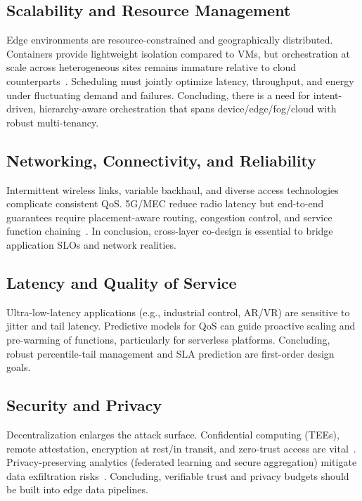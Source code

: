 \documentclass[conference]{IEEEtran}
\begin{document}
\subsection{Scalability and Resource Management}
Edge environments are resource-constrained and geographically distributed. Containers provide lightweight isolation compared to VMs, but orchestration at scale across heterogeneous sites remains immature relative to cloud counterparts~\cite{Mao2017MEC,Mach2017MEC}. Scheduling must jointly optimize latency, throughput, and energy under fluctuating demand and failures. Concluding, there is a need for intent-driven, hierarchy-aware orchestration that spans device/edge/fog/cloud with robust multi-tenancy.

\subsection{Networking, Connectivity, and Reliability}
Intermittent wireless links, variable backhaul, and diverse access technologies complicate consistent QoS. 5G/MEC reduce radio latency but end-to-end guarantees require placement-aware routing, congestion control, and service function chaining~\cite{ETSI2016MEC}. In conclusion, cross-layer co-design is essential to bridge application SLOs and network realities.

\subsection{Latency and Quality of Service}
Ultra-low-latency applications (e.g., industrial control, AR/VR) are sensitive to jitter and tail latency. Predictive models for QoS can guide proactive scaling and pre-warming of functions, particularly for serverless platforms. Concluding, robust percentile-tail management and SLA prediction are first-order design goals.

\subsection{Security and Privacy}
Decentralization enlarges the attack surface. Confidential computing (TEEs), remote attestation, encryption at rest/in transit, and zero-trust access are vital~\cite{Schuster2015VC3}. Privacy-preserving analytics (federated learning and secure aggregation) mitigate data exfiltration risks~\cite{McMahan2017FL,Bonawitz2017SA}. Concluding, verifiable trust and privacy budgets should be built into edge data pipelines.
\end{document}
